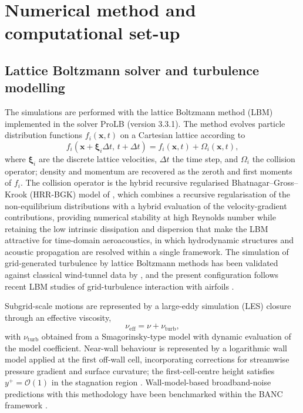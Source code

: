 \documentclass[lineno]{JFM-FLM_Au}
\begin{document}
\section{Numerical method and computational set-up}
\label{sec:method}

\subsection{Lattice Boltzmann solver and turbulence modelling}
\label{sec:method_solver}

The simulations are performed with the lattice Boltzmann method (LBM)
implemented in the solver ProLB (version 3.3.1). The method evolves
particle distribution functions $f_i(\boldsymbol{x},t)$ on a Cartesian
lattice according to
\begin{equation}
  f_i(\boldsymbol{x} + \boldsymbol{\xi}_i\Delta t,\, t + \Delta t)
  = f_i(\boldsymbol{x},t) + \Omega_i(\boldsymbol{x},t),
  \label{eq:lbm}
\end{equation}
where $\boldsymbol{\xi}_i$ are the discrete lattice velocities,
$\Delta t$ the time step, and $\Omega_i$ the collision operator;
density and momentum are recovered as the zeroth and first moments of
$f_i$. The collision operator is the hybrid recursive regularised
Bhatnagar--Gross--Krook (HRR-BGK) model of \citet{Jacob2018}, which
combines a recursive regularisation of the non-equilibrium distributions
with a hybrid evaluation of the velocity-gradient contributions, providing
numerical stability at high Reynolds number while retaining the low
intrinsic dissipation and dispersion that make the LBM attractive for
time-domain aeroacoustics, in which hydrodynamic structures and acoustic
propagation are resolved within a single framework. The simulation of
grid-generated turbulence by lattice Boltzmann methods has been validated
against classical wind-tunnel data by \citet{Djenidi2006}, and the present
configuration follows recent LBM studies of grid-turbulence interaction
with airfoils \citep{Trascinelli2023,Piccolo2024}.

Subgrid-scale motions are represented by a large-eddy simulation (LES)
closure through an effective viscosity,
\begin{equation}
  \nu_{\mathrm{eff}} = \nu + \nu_{\mathrm{turb}},
  \label{eq:visc}
\end{equation}
with $\nu_{\mathrm{turb}}$ obtained from a Smagorinsky-type model
\citep{Smagorinsky1963} with dynamic evaluation of the model coefficient.
Near-wall behaviour is represented by a logarithmic wall model applied at
the first off-wall cell, incorporating corrections for streamwise pressure
gradient and surface curvature; the first-cell-centre height satisfies
$y^+ = \mathcal{O}(1)$ in the stagnation region
. Wall-model-based broadband-noise predictions with this methodology have
been benchmarked within the BANC framework \citep{Herr2015}.
\end{document}

